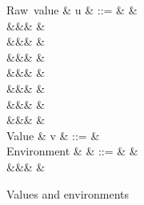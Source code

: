 \begin{figure}[H]
\begin{syntaxfig}
\mbox{Raw value}
&
u
&
::=
&
\exTrue \mid \exFalse
&
\\
&&&
&
\\
&&&
\exPrim{\phi}
&
\\
&&&
&
\\
&&&
&
\\
&&&
\exNil
&
\\
&&&
&
\\
&&&
&
\\[2mm]
\mbox{Value}
&
v
&
::=
&
\\[2mm]
\mbox{Environment}
&
\rho
&
::=
&
\envEmpty
&
\\
&&&
&
\end{syntaxfig}
\caption{Values and environments}
\end{figure}
